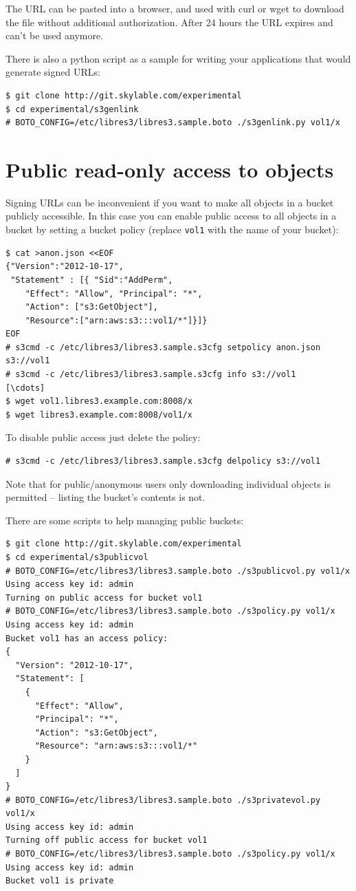 The URL can be pasted into a browser, and used with curl or wget to download the file without additional authorization. After 24 hours the URL expires and can't be used anymore.

There is also a python script as a sample for writing your applications that
would generate signed URLs:
\begin{lstlisting}
$ git clone http://git.skylable.com/experimental
$ cd experimental/s3genlink
# BOTO_CONFIG=/etc/libres3/libres3.sample.boto ./s3genlink.py vol1/x
\end{lstlisting}

\section*{Public read-only access to objects}

Signing URLs can be inconvenient if you want to make all objects in a bucket
publicly accessible.
In this case you can enable public access to all objects in a bucket by setting
a bucket policy (replace \verb|vol1| with the name of your bucket):
\begin{lstlisting}
$ cat >anon.json <<EOF
{"Version":"2012-10-17",
 "Statement" : [{ "Sid":"AddPerm",
    "Effect": "Allow", "Principal": "*",
    "Action": ["s3:GetObject"],
    "Resource":["arn:aws:s3:::vol1/*"]}]}
EOF
# s3cmd -c /etc/libres3/libres3.sample.s3cfg setpolicy anon.json s3://vol1
# s3cmd -c /etc/libres3/libres3.sample.s3cfg info s3://vol1
[\cdots]
$ wget vol1.libres3.example.com:8008/x
$ wget libres3.example.com:8008/vol1/x
\end{lstlisting}

To disable public access just delete the policy:

\begin{lstlisting}
# s3cmd -c /etc/libres3/libres3.sample.s3cfg delpolicy s3://vol1
\end{lstlisting}

Note that for public/anonymous users only downloading individual objects is
permitted -- listing the bucket's contents is not.

There are some scripts to help managing public buckets:
\begin{lstlisting}
$ git clone http://git.skylable.com/experimental
$ cd experimental/s3publicvol
# BOTO_CONFIG=/etc/libres3/libres3.sample.boto ./s3publicvol.py vol1/x
Using access key id: admin
Turning on public access for bucket vol1
# BOTO_CONFIG=/etc/libres3/libres3.sample.boto ./s3policy.py vol1/x
Using access key id: admin
Bucket vol1 has an access policy:
{
  "Version": "2012-10-17",
  "Statement": [
    {
      "Effect": "Allow",
      "Principal": "*",
      "Action": "s3:GetObject",
      "Resource": "arn:aws:s3:::vol1/*"
    }
  ]
}
# BOTO_CONFIG=/etc/libres3/libres3.sample.boto ./s3privatevol.py vol1/x
Using access key id: admin
Turning off public access for bucket vol1
# BOTO_CONFIG=/etc/libres3/libres3.sample.boto ./s3policy.py vol1/x
Using access key id: admin
Bucket vol1 is private
\end{lstlisting}

